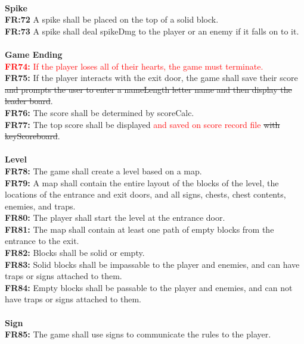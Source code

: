 \documentclass[12pt, titlepage]{article}
\begin{document}
\\
\textbf{Spike}\\
\textbf{FR:72} A spike shall be placed on the top of a solid block.\\
\textbf{FR:73} A spike shall deal spikeDmg to the player or an enemy if it falls on to it.\\
\\
\textbf{Game Ending}\\
\textcolor{red}{\textbf{FR74:} If the player loses all of their hearts, the game must terminate.}\\
\textbf{FR75:} If the player interacts with the exit door, the game shall save their score \st{and prompts the user to enter a nameLength letter name and then display the leader board}.\\
\textbf{FR76:} The score shall be determined by scoreCalc.\\
\textbf{FR77:} The top score shall be displayed \textcolor{red}{and saved on score record file} \st{with keyScoreboard}.\\
\\
\textbf{Level}\\
\textbf{FR78:} The game shall create a level based on a map.\\
\textbf{FR79:} A map shall contain the entire layout of the blocks of the level, the locations of the entrance and exit doors, and all signs, chests, chest contents, enemies, and traps.\\
\textbf{FR80:} The player shall start the level at the entrance door.\\
\textbf{FR81:} The map shall contain at least one path of empty blocks from the entrance to the exit.\\
\textbf{FR82:} Blocks shall be solid or empty.\\
\textbf{FR83:} Solid blocks shall be impassable to the player and enemies, and can have traps or signs attached to them.\\
\textbf{FR84:} Empty blocks shall be passable to the player and enemies, and can not have traps or signs attached to them.\\
\\
\textbf{Sign}\\
\textbf{FR85:} The game shall use signs to communicate the rules to the player.\\
\end{document}
